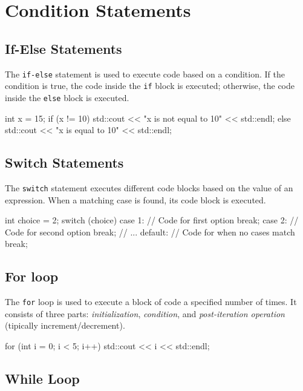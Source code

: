 \section{Condition Statements}

\subsection{If-Else Statements}

The \texttt{if-else} statement is used to execute code based on a condition. If the condition is true, the code inside the \texttt{if} block is executed; otherwise, the code inside the \texttt{else} block is executed.

\begin{codeblock}[language=C++]
int x = 15;
if (x != 10) {
    std::cout << "x is not equal to 10" << std::endl;
} else {
    std::cout << "x is equal to 10" << std::endl;
}
\end{codeblock}

\subsection{Switch Statements}

The \texttt{switch} statement executes different code blocks based on the value of an expression. When a matching case is found, its code block is executed.

\begin{codeblock}[language=C++]
int choice = 2;
switch (choice) {
    case 1:
        // Code for first option
        break;
    case 2:
        // Code for second option
        break;
    // ...
    default:
        // Code for when no cases match
        break;
}
\end{codeblock}

\subsection{For loop}

The \texttt{for} loop is used to execute a block of code a specified number of times. It consists of three parts: \textit{initialization}, \textit{condition}, and \textit{post-iteration operation} (tipically increment/decrement).

\begin{codeblock}[language=C++]
for (int i = 0; i < 5; i++) {
    std::cout << i << std::endl;
}
\end{codeblock}

\subsection{While Loop}

